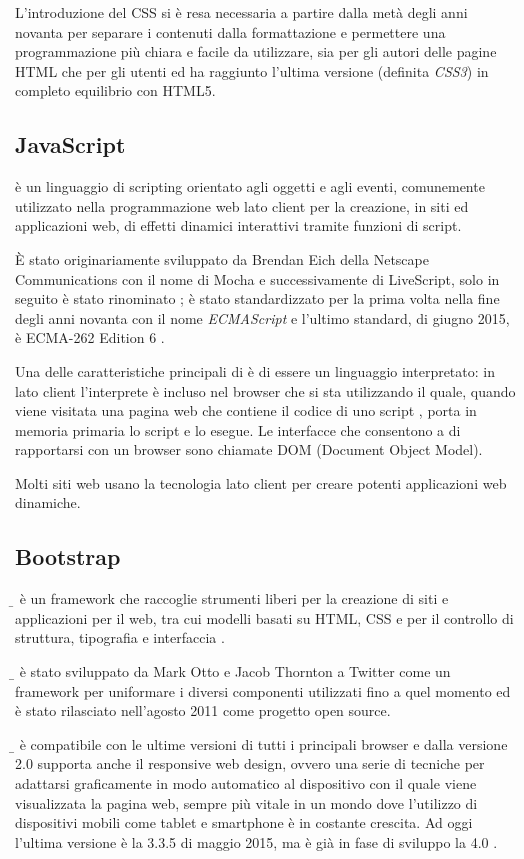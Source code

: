 L'introduzione del CSS si è resa necessaria a partire dalla metà degli anni novanta per separare i contenuti dalla formattazione e permettere una programmazione più chiara e facile da utilizzare, sia per gli autori delle pagine HTML che per gli utenti ed ha raggiunto l'ultima versione (definita \emph{CSS3}) in completo equilibrio con HTML5.

\subsection*{JavaScript}
\label{subs:js}
\emph{{\js}} è un linguaggio di scripting orientato agli oggetti e agli eventi, comunemente utilizzato nella programmazione web lato client per la creazione, in siti ed applicazioni web, di effetti dinamici interattivi tramite funzioni di script. 

È stato originariamente sviluppato da Brendan Eich della Netscape Communications con il nome di Mocha e successivamente di LiveScript, solo in seguito è stato rinominato {\js}; è stato standardizzato per la prima volta nella fine degli anni novanta con il nome \emph{ECMAScript} e l'ultimo standard, di giugno 2015, è ECMA-262 Edition 6 \cite{jsecma}.

Una delle caratteristiche principali di {\js} è di essere un linguaggio interpretato: in {\js} lato client l'interprete è incluso nel browser che si sta utilizzando il quale, quando viene visitata una pagina web che contiene il codice di uno script {\js}, porta in memoria primaria lo script e lo esegue. Le interfacce che consentono a {\js} di rapportarsi con un browser sono chiamate DOM (Document Object Model). 

Molti siti web usano la tecnologia {\js} lato client per creare potenti applicazioni web dinamiche.

\subsection*{Bootstrap}
\label{subs:bootstrap}
\emph{{\b}} è un framework che raccoglie strumenti liberi per la creazione di siti e applicazioni per il web, tra cui modelli basati su HTML, CSS e {\js} per il controllo di struttura, tipografia e interfaccia \cite{bootstrap}.

{\b} è stato sviluppato da Mark Otto e Jacob Thornton a Twitter come un framework per uniformare i diversi componenti utilizzati fino a quel momento ed è stato rilasciato nell'agosto 2011 come progetto open source.

{\b} è compatibile con le ultime versioni di tutti i principali browser e dalla versione 2.0 supporta anche il responsive web design, ovvero una serie di tecniche per adattarsi graficamente in modo automatico al dispositivo con il quale viene visualizzata la pagina web, sempre più vitale in un mondo dove l'utilizzo di dispositivi mobili come tablet e smartphone è in costante crescita. Ad oggi l'ultima versione è la 3.3.5 di maggio 2015, ma è già in fase di sviluppo la 4.0 \cite{bootstrap-github}.

